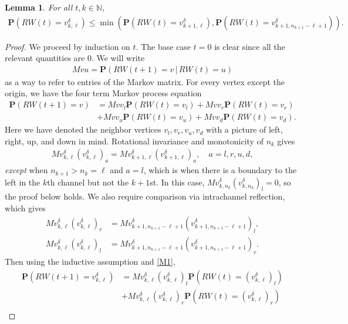 \documentclass[]{amsart}
\newtheorem{lem}[thm]{Lemma}
\numberwithin{equation}{section}
\begin{document}
\begin{lem} \label{lem_interior}
For all $t, k \in \mathbb{N}$, 
\begin{align}\mathbf{P}(RW(t) = v^{\delta}_{k,\ell}) \le \min (\mathbf{P}(RW(t) = v^{\delta}_{k+1,\ell}) , \mathbf{P}(RW(t) =  v^{\delta}_{k+1,n_{k+1}-\ell+1})).
\end{align}
\end{lem}
\begin{proof}
We proceed by induction on $t$.  The base case $t=0$ is clear since all the relevant quantities are 0.  We will write 
\begin{align}
Mvu = \mathbf{P}(RW(t+1) = v \, | \, RW(t) = u)
\end{align}
as a way to refer to entries of the Markov matrix.
For every vertex except the origin, we have the four term Markov process equation
\begin{align}
\mathbf{P}(RW(t+1) = v) &= Mvv_l \mathbf{P}(RW(t) = v_l) 
+ Mvv_r \mathbf{P}(RW(t) = v_r)\\
& + Mvv_u \mathbf{P}(RW(t) = v_u) + Mvv_d \mathbf{P}(RW(t) = v_d).
\end{align}
Here we have denoted the neighbor vertices $v_l, v_r, v_u, v_d$ with a picture of left, right, up, and down in mind.  Rotational invariance and monotonicity of $n_k$ gives
\begin{align} \label{M1}
Mv^{\delta}_{k,\ell}(v^{\delta}_{k,\ell})_a = Mv^{\delta}_{k+1,\ell}(v^{\delta}_{k+1,\ell})_a, \quad a = l, r, u, d,
\end{align}
\textit{except} when $n_{k+1} > n_k = \ell$ and $a = l$, which is when there is a boundary to the left in the $k$th channel but not the $k+1$st.  In this case, $Mv^{\delta}_{k,n_k}(v^{\delta}_{k,n_k})_l = 0$, so the proof below holds.
We also require comparison via intrachannel reflection, which gives
\begin{align}
Mv^{\delta}_{k,\ell}(v^{\delta}_{k,\ell})_r &= Mv^{\delta}_{k+1,n_{k+1}-\ell+1}(v^{\delta}_{k+1,n_{k+1}-\ell+1})_l,\\
Mv^{\delta}_{k,\ell}(v^{\delta}_{k,\ell})_l &= Mv^{\delta}_{k+1,n_{k+1}-\ell+1}(v^{\delta}_{k+1,n_{k+1}-\ell+1})_r.
\end{align}
Then using the inductive assumption and \ref{M1},
\begin{align}
\mathbf{P}(RW(t+1) = v^{\delta}_{k,\ell}) &= Mv^{\delta}_{k,\ell}(v^{\delta}_{k,\ell})_l \mathbf{P}(RW(t) = (v^{\delta}_{k,\ell})_l) \\
&+ Mv^{\delta}_{k,\ell}(v^{\delta}_{k,\ell})_r \mathbf{P}(RW(t) = (v^{\delta}_{k,\ell})_r)\\

\end{align}
\end{proof}
\end{document}
